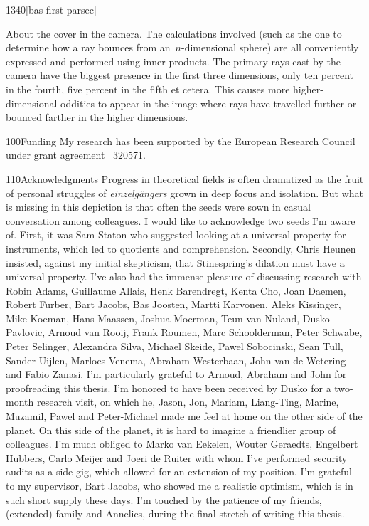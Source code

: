 \begin{parsec}{1340}[bas-first-parsec]
\begin{point}{91}{About the cover}
    in the camera.
The calculations involved (such as the one to determine how a ray bounces
    from an~$n$-dimensional sphere)
    are all conveniently expressed and performed using
    inner products.
The primary rays cast by the camera have the biggest presence
    in the first three dimensions, only ten percent in the fourth,
    five percent in the fifth et cetera.
This causes more higher-dimensional oddities to appear in the image
    where rays have travelled further or bounced farther in the
    higher dimensions.
\end{point}
\begin{point}{100}{Funding}
My research has been supported by the
European Research Council under grant agreement \textnumero~320571.
\end{point}
\begin{point}{110}{Acknowledgments}%
Progress in theoretical fields
    is often dramatized
    as the fruit of personal struggles of  \emph{einzelg\"angers}
    grown in deep focus and isolation.
But what is missing in this depiction is that
    often the seeds were sown
    in casual conversation among colleagues.
I would like to acknowledge two seeds I'm aware of.
First, it was Sam Staton who suggested looking at a universal property
    for instruments, which led to quotients and comprehension.
Secondly, Chris Heunen insisted,
    against my initial skepticism,
    that Stinespring's dilation must have a
    universal property.
I've also had the immense pleasure of discussing research with
    Robin Adams,
    Guillaume Allais,
    Henk Barendregt,
    Kenta Cho,
    Joan Daemen,
    Robert Furber,
    Bart Jacobs,
    Bas Joosten,
    Martti Karvonen,
    Aleks Kissinger,
    Mike Koeman,
    Hans Maassen,
    Joshua Moerman,
    Teun van Nuland,
    Dusko Pavlovic,
    Arnoud van Rooij,
    Frank Roumen,
    Marc Schoolderman,
    Peter Schwabe,
    Peter Selinger,
    Alexandra Silva,
    Michael Skeide,
    Pawel Sobocinski,
    Sean Tull,
    Sander Uijlen,
    Marloes Venema,
    Abraham Westerbaan,
    John van de Wetering and
    Fabio Zanasi.
I'm particularly grateful to Arnoud, Abraham and John
    for proofreading this thesis.
I'm honored to have been received by Dusko
    for a two-month research visit,
    on which he, Jason, Jon, Mariam, Liang-Ting, Marine, Muzamil, Pawel
    and Peter-Michael made me feel at home on the other side of the planet.
On this side of the planet,
    it is hard to imagine a friendlier group of colleagues.
I'm much obliged to Marko van Eekelen,
    Wouter Geraedts,
    Engelbert Hubbers,
    Carlo Meijer and
    Joeri de Ruiter
    with whom I've performed security audits as a side-gig,
    which allowed for an extension of my position.
I'm grateful to my supervisor, Bart Jacobs,
    who showed me a realistic optimism,
    which is in such short supply these days.
I'm touched by the patience of my friends, (extended) family and Annelies,
    during the final stretch of writing this thesis.


\end{point}
\end{parsec}
